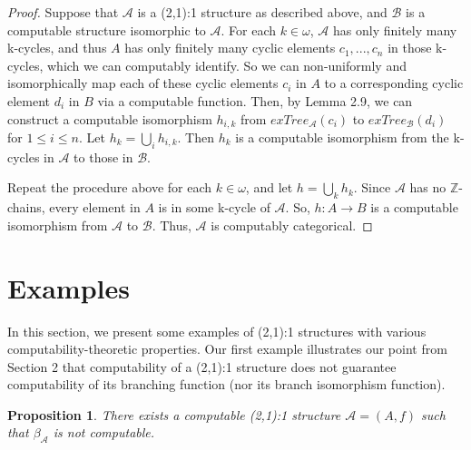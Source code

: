 \documentclass[12pt]{article}
\newtheorem{prop}[thm]{Proposition}
\begin{document}
\begin{proof}
Suppose that $\mathcal{A}$ is a (2,1):1 structure as described above, and $\mathcal{B}$ is a computable structure isomorphic to $\mathcal{A}$. For each $k \in \omega$, $\mathcal{A}$ has only finitely many k-cycles, and thus $A$ has only finitely many cyclic elements $c_1,...,c_n$ in those k-cycles, which we can computably identify. So we can non-uniformly and isomorphically map each of these cyclic elements $c_i$ in $A$ to a corresponding cyclic element $d_i$ in $B$ via a computable function. Then, by Lemma 2.9, we can construct a computable isomorphism $h_{i,k}$ from $exTree_\mathcal{A}(c_i)$ to $exTree_\mathcal{B}(d_i)$ for $1 \leq i \leq n$. Let $h_k=\bigcup_i h_{i,k}$. Then $h_k$ is a computable isomorphism from the k-cycles in $\mathcal{A}$ to those in $\mathcal{B}$.

Repeat the procedure above for each $k \in \omega$, and let $h = \bigcup_k h_k$. Since $\mathcal{A}$ has no $\mathbb{Z}$-chains, every element in $A$ is in some k-cycle of $\mathcal{A}$. So, $h: A \to B$ is a computable isomorphism from $\mathcal{A}$ to $\mathcal{B}$. Thus, $\mathcal{A}$ is computably categorical.
\end{proof}


\section{Examples}

In this section, we present some examples of (2,1):1 structures with various computability-theoretic properties. Our first example illustrates our point from Section 2 that computability of a (2,1):1 structure does not guarantee computability of its branching function (nor its branch isomorphism function). 

\begin{prop}
There exists a computable (2,1):1 structure $\mathcal{A}=(A,f)$ such that $\beta_\mathcal{A}$ is not computable.
\end{prop}
\end{document}
